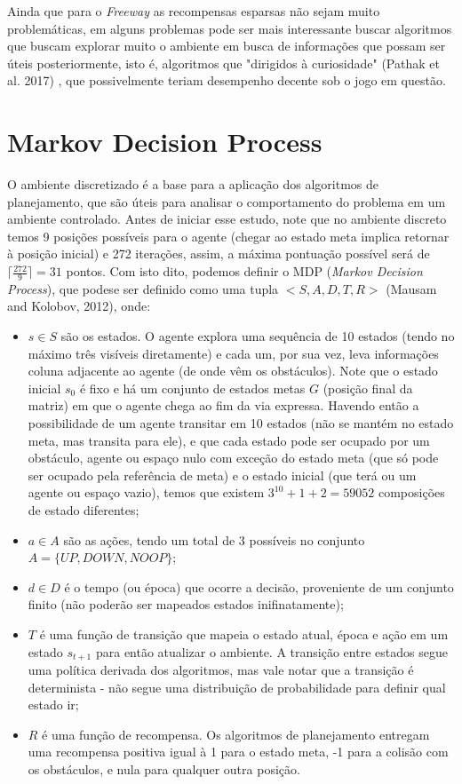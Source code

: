\documentclass[letterpaper]{article} %
\begin{document}
Ainda que para o \textit{Freeway} as recompensas esparsas não sejam muito problemáticas, em alguns problemas pode ser mais interessante buscar algoritmos que buscam explorar muito o ambiente em busca de informações que possam ser úteis posteriormente, isto é, algoritmos que "dirigidos à curiosidade" (Pathak et al. 2017) , que possivelmente teriam desempenho decente sob o jogo em questão.

\section{Markov Decision Process}
O ambiente discretizado é a base para a aplicação dos algoritmos de planejamento, que são úteis para analisar o comportamento do problema em um ambiente controlado. Antes de iniciar esse estudo, note que no ambiente discreto temos 9 posições possíveis para o agente (chegar ao estado meta implica retornar à posição inicial) e 272 iterações, assim, a máxima pontuação possível será de $\lceil \frac{272}{9}\rceil = 31$ pontos. Com isto dito, podemos definir o MDP (\textit{Markov Decision Process}), que podese ser definido como uma tupla $<S,A,D,T,R>$ (Mausam and Kolobov, 2012), onde: 

\begin{itemize}

\item $s \in S$ são os estados. O agente explora uma sequência de 10 estados (tendo no máximo três visíveis diretamente) e cada um, por sua vez, leva informações coluna adjacente ao agente (de onde vêm os obstáculos). Note que o estado inicial $s_0$ é fixo e há um conjunto de estados metas $G$ (posição final da matriz) em que o agente chega ao fim da via expressa. Havendo então a possibilidade de um agente transitar em 10 estados (não se mantém no estado meta, mas transita para ele), e que cada estado pode ser ocupado por um obstáculo, agente ou espaço nulo com exceção do estado meta (que só pode ser ocupado pela referência de meta) e o estado inicial (que terá ou um agente ou espaço vazio), temos que existem $3^{10} + 1 + 2 = 59052$ composições de estado diferentes;

\item $a \in A$ são as ações, tendo um total de 3 possíveis no conjunto  $A = \{UP, DOWN, NOOP\}$;

\item $d \in D$ é o tempo (ou época) que ocorre a decisão, proveniente de um conjunto finito (não poderão ser mapeados estados inifinatamente);

\item $T$ é uma função de transição que mapeia o estado atual, época e ação em um estado $s_{t+1}$ para então atualizar o ambiente. A transição entre estados segue uma política derivada dos algoritmos, mas vale notar que a transição é determinista - não segue uma distribuição de probabilidade para definir qual estado ir;

\item $R$ é uma função de recompensa. Os algoritmos de planejamento entregam uma recompensa positiva igual à 1 para o estado meta, -1 para a colisão com os obstáculos, e nula para qualquer outra posição.

\end{itemize}
\end{document}
